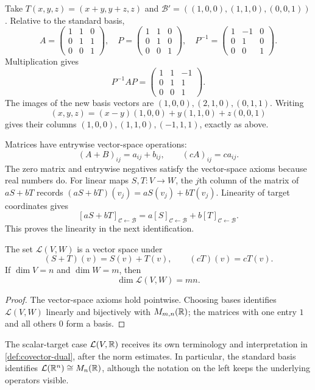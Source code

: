 \begin{example}
Take $T(x,y,z)=(x+y,y+z,z)$ and
$\mathcal B'=((1,0,0),(1,1,0),(0,0,1))$. Relative to the standard basis,
\[
A=\begin{pmatrix}1&1&0\\0&1&1\\0&0&1\end{pmatrix},\quad
P=\begin{pmatrix}1&1&0\\0&1&0\\0&0&1\end{pmatrix},\quad
P^{-1}=\begin{pmatrix}1&-1&0\\0&1&0\\0&0&1\end{pmatrix}.
\]
Multiplication gives
\[
P^{-1}AP=\begin{pmatrix}1&1&-1\\0&1&1\\0&0&1\end{pmatrix}.
\]
The images of the new basis vectors are $(1,0,0),(2,1,0),(0,1,1)$.
Writing
\[
(x,y,z)=(x-y)(1,0,0)+y(1,1,0)+z(0,0,1)
\]
gives their columns $(1,0,0),(1,1,0),(-1,1,1)$, exactly as above.
\end{example}
Matrices have entrywise vector-space operations:
\[
(A+B)_{ij}=a_{ij}+b_{ij},\qquad (cA)_{ij}=ca_{ij}.
\]
The zero matrix and entrywise negatives satisfy the vector-space axioms
because real numbers do. For linear maps $S,T:V\to W$, the $j$th column
of the matrix of $aS+bT$ records
$(aS+bT)(v_j)=aS(v_j)+bT(v_j)$. Linearity of target coordinates gives
\[
[aS+bT]_{\mathcal C\leftarrow\mathcal B}
=a[S]_{\mathcal C\leftarrow\mathcal B}+b[T]_{\mathcal C\leftarrow\mathcal B}.
\]
This proves the linearity in the next identification.
\begin{proposition}
\label{prop:linear-map-space-structure}
The set $\mathcal L(V,W)$ is a vector space under
\[
(S+T)(v)=S(v)+T(v),\qquad (cT)(v)=cT(v).
\]
If $\dim V=n$ and $\dim W=m$, then
\[
\dim\mathcal L(V,W)=mn.
\]
\end{proposition}
\begin{proof}
The vector-space axioms hold pointwise. Choosing bases identifies
$\mathcal L(V,W)$ linearly and bijectively with $M_{m,n}(\mathbb{R})$; the matrices
with one entry $1$ and all others $0$ form a basis.
\end{proof}
The scalar-target case $\mathcal L(V,\mathbb{R})$ receives its own terminology
and interpretation in \cref{def:covector-dual}, after the norm estimates.
In particular, the standard basis identifies
$\mathcal L(\mathbb{R}^n)\cong M_n(\mathbb{R})$, although the notation on the left keeps
the underlying operators visible.


